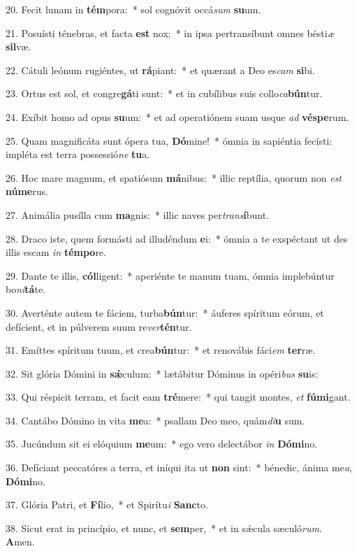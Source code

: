 20. Fecit lunam in \textbf{tém}pora:~*  sol cognóvit occá\textit{sum} \textbf{su}um.\

21. Posuísti ténebras, et facta \textbf{est} nox:~*  in ipsa pertransíbunt omnes bésti\textit{æ} \textbf{sil}væ.\

22. Cátuli leónum rugiéntes, ut \textbf{rá}piant:~*  et quærant a Deo es\textit{cam} \textbf{si}bi.\

23. Ortus est sol, et congre\textbf{gá}ti sunt:~*  et in cubílibus suis collo\textit{ca}\textbf{bún}tur.\

24. Exíbit homo ad opus \textbf{su}um:~*  et ad operatiónem suam usque \textit{ad} \textbf{vés}\textbf{pe}rum.\

25. Quam magnificáta sunt ópera tua, \textbf{Dó}mine!~*  ómnia in sapiéntia fecísti: impléta est terra possessió\textit{ne} \textbf{tu}a.\

26. Hoc mare magnum, et spatiósum \textbf{má}nibus:~*  illic reptília, quorum non \textit{est} \textbf{nú}\textbf{me}rus.\

27. Animália pusílla cum \textbf{ma}gnis:~*  illic naves per\textit{trans}\textbf{í}bunt.\

28. Draco iste, quem formásti ad illudéndum \textbf{e}i:~*  ómnia a te exspéctant ut des illis escam \textit{in} \textbf{tém}\textbf{po}re.\

29. Dante te illis, \textbf{cól}ligent:~*  aperiénte te manum tuam, ómnia implebúntur bo\textit{ni}\textbf{tá}te.\

30. Averténte autem te fáciem, turba\textbf{bún}tur:~*  áuferes spíritum eórum, et defícient, et in púlverem suum re\textit{ver}\textbf{tén}tur.\

31. Emíttes spíritum tuum, et crea\textbf{bún}tur:~*  et renovábis fáci\textit{em} \textbf{ter}ræ.\

32. Sit glória Dómini in \textbf{sǽ}culum:~*  lætábitur Dóminus in opéri\textit{bus} \textbf{su}is:\

33. Qui réspicit terram, et facit eam \textbf{tré}mere:~*  qui tangit montes, \textit{et} \textbf{fú}\textbf{mi}gant.\

34. Cantábo Dómino in vita \textbf{me}a:~*  psallam Deo meo, quám\textit{di}\textbf{u} sum.\

35. Jucúndum sit ei elóquium \textbf{me}um:~*  ego vero delectábor \textit{in} \textbf{Dó}\textbf{mi}no.\

36. Defíciant peccatóres a terra, et iníqui ita ut \textbf{non} sint:~*  bénedic, ánima me\textit{a}, \textbf{Dó}\textbf{mi}no.\

37. Glória Patri, et \textbf{Fí}lio,~*  et Spirítu\textit{i} \textbf{Sanc}to.\

38. Sicut erat in princípio, et nunc, et \textbf{sem}per,~*  et in sǽcula sæculó\textit{rum}. \textbf{A}men.\

